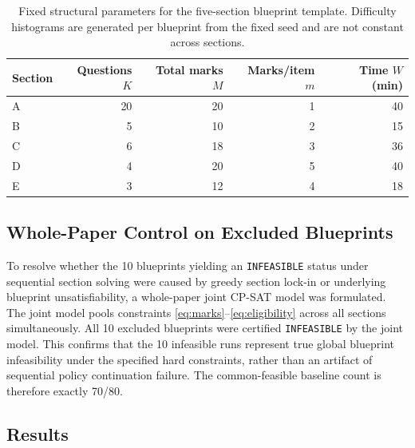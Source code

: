\documentclass[runningheads]{llncs}
\begin{document}
\begin{table}[t]
\caption{Fixed structural parameters for the five-section blueprint template. Difficulty histograms are generated per blueprint from the fixed seed and are not constant across sections.}
\label{tab:manifest}
\centering
\small
\begin{tabular}{@{}lrrrr@{}}
\toprule
Section & Questions $K$ & Total marks $M$ & Marks/item $m$ & Time $W$ (min) \\
\midrule
A & 20 & 20 & 1 & 40 \\
B & 5  & 10 & 2 & 15 \\
C & 6  & 18 & 3 & 36 \\
D & 4  & 20 & 5 & 40 \\
E & 3  & 12 & 4 & 18 \\
\bottomrule
\end{tabular}
\end{table}

\subsection{Whole-Paper Control on Excluded Blueprints}
To resolve whether the 10 blueprints yielding an \texttt{INFEASIBLE} status under sequential section solving were caused by greedy section lock-in or underlying blueprint unsatisfiability, a whole-paper joint CP-SAT model was formulated. The joint model pools constraints \eqref{eq:marks}--\eqref{eq:eligibility} across all sections simultaneously. All 10 excluded blueprints were certified \texttt{INFEASIBLE} by the joint model. This confirms that the 10 infeasible runs represent true global blueprint infeasibility under the specified hard constraints, rather than an artifact of sequential policy continuation failure. The common-feasible baseline count is therefore exactly 70/80.

\subsection{Results}
\end{document}
